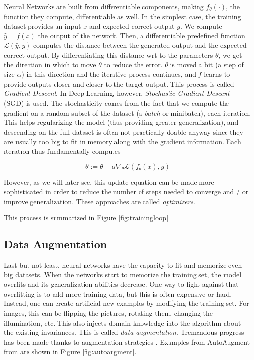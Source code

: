 Neural Networks are built from differentiable components, making $f_\theta(\cdot)$, the function they compute, differentiable as well. In the simplest case, the training dataset provides an input $x$ and expected correct output $y$. We compute $\hat{y}=f(x)$ the output of the network. Then, a differentiable predefined function $\mathcal{L}(\hat{y}, y)$ computes the distance between the generated output and the expected correct output. By differentiating this distance wrt to the parameters $\theta$, we get the direction in which to move $\theta$ to reduce the error. $\theta$ is moved a bit (a step of size $\alpha$) in this direction and the iterative process continues, and $f$ learns to provide outputs closer and closer to the target output. This process is called \emph{Gradient Descent}. In Deep Learning, however, \emph{Stochastic Gradient Descent} (SGD) is used. The stochasticity comes from the fact that we compute the gradient on a random subset of the dataset (a \emph{batch} or minibatch), each iteration. This helps regularizing the model (thus providing greater generalization), and descending on the full dataset is often not practically doable anyway since they are usually too big to fit in memory along with the gradient information. Each iteration thus fundamentally computes

\begin{equation}
    \theta := \theta - \alpha \nabla_\theta \mathcal{L}(f_\theta(x), y)
\end{equation}

However, as we will later see, this update equation can be made more sophisticated in order to reduce the number of steps needed to converge and / or improve generalization. These approaches are called \emph{optimizers}.

This process is summarized in Figure \ref{fig:trainingloop}.

\subsection{Data Augmentation}
\label{sec:trivialaugment}

Last but not least, neural networks have the capacity to fit and memorize even big datasets. When the networks start to memorize the training set, the model overfits and its generalization abilities decrease. One way to fight against that overfitting is to add more training data, but this is often expensive or hard. Instead, one can create artificial new examples by modifying the training set. For images, this can be flipping the pictures, rotating them, changing the illumination, etc. This also injects domain knowledge into the algorithm about the existing invariances. This is called \emph{data augmentation}. Tremendous progress has been made thanks to augmentation strategies \citep{cutmix,randaugment,mixup,cutout}. Examples from AutoAugment from \citet{autoaugment} are shown in Figure \ref{fig:autoaugment}.

